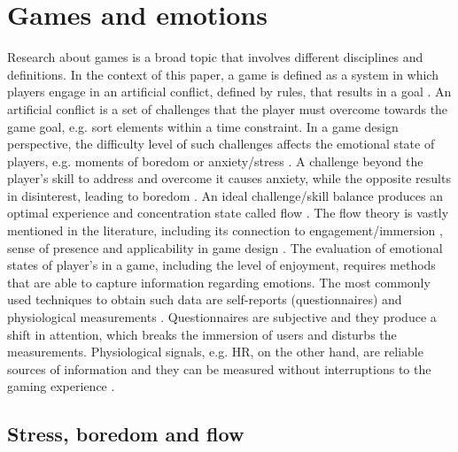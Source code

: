 \chapter{Games and emotions}

Research about games is a broad topic that involves different disciplines and definitions. In the context of this paper, a game is defined as a system in which players engage in an artificial conflict, defined by rules, that results in a goal \parencite{salen2004rules}. An artificial conflict is a set of challenges that the player must overcome towards the game goal, e.g. sort elements within a time constraint. In a game design perspective, the difficulty level of such challenges affects the emotional state of players, e.g. moments of boredom or anxiety/stress \parencite{schell2014art}. A challenge beyond the player's skill to address and overcome it causes anxiety, while the opposite results in disinterest, leading to boredom \parencite{chen2007flow}. An ideal challenge/skill balance produces an optimal experience and concentration state called flow \parencite{csikszentmihalyi1990psychology}. The flow theory is vastly mentioned in the literature, including its connection to engagement/immersion \parencite{brown2004grounded}, sense of presence \parencite{weibel2011immersion} and applicability in game design \parencite{cruz2017player, sweetser2005gameflow}. The evaluation of emotional states of player's in a game, including the level of enjoyment, requires methods that are able to capture information regarding emotions. The most commonly used techniques to obtain such data are self-reports (questionnaires) and physiological measurements \parencite{mekler2014systematic}. Questionnaires are subjective and they produce a shift in attention, which breaks the immersion of users and disturbs the measurements. Physiological signals, e.g. HR, on the other hand, are reliable sources of information and they can be measured without interruptions to the gaming experience \parencite{bousefsaf2013remote,yun2009game,rani2006empirical,tijs2008dynamic}.

\section{Stress, boredom and flow}

